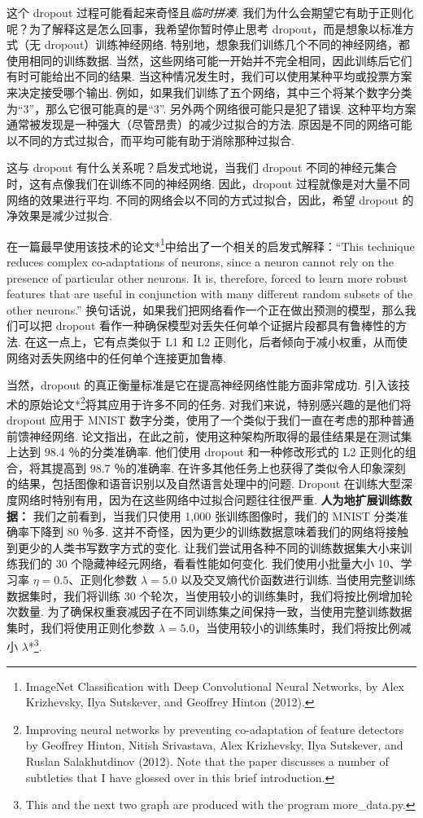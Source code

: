 这个 dropout 过程可能看起来奇怪且\emph{临时拼凑}. 我们为什么会期望它有助于正则化呢？为了解释这是怎么回事，我希望你暂时停止思考 dropout，而是想象以标准方式（无 dropout）训练神经网络. 特别地，想象我们训练几个不同的神经网络，都使用相同的训练数据. 当然，这些网络可能一开始并不完全相同，因此训练后它们有时可能给出不同的结果. 当这种情况发生时，我们可以使用某种平均或投票方案来决定接受哪个输出. 例如，如果我们训练了五个网络，其中三个将某个数字分类为``3''，那么它很可能真的是``3''. 另外两个网络很可能只是犯了错误. 这种平均方案通常被发现是一种强大（尽管昂贵）的减少过拟合的方法. 原因是不同的网络可能以不同的方式过拟合，而平均可能有助于消除那种过拟合.

这与 dropout 有什么关系呢？启发式地说，当我们 dropout 不同的神经元集合时，这有点像我们在训练不同的神经网络. 因此，dropout 过程就像是对大量不同网络的效果进行平均. 不同的网络会以不同的方式过拟合，因此，希望 dropout 的净效果是减少过拟合.

在一篇最早使用该技术的论文*\footnote{ImageNet Classification with Deep Convolutional Neural Networks, by Alex Krizhevsky, Ilya Sutskever, and Geoffrey Hinton (2012).}中给出了一个相关的启发式解释：``This technique reduces complex co-adaptations of neurons, since a neuron cannot rely on the presence of particular other neurons. It is, therefore, forced to learn more robust features that are useful in conjunction with many different random subsets of the other neurons.'' 换句话说，如果我们把网络看作一个正在做出预测的模型，那么我们可以把 dropout 看作一种确保模型对丢失任何单个证据片段都具有鲁棒性的方法. 在这一点上，它有点类似于 L1 和 L2 正则化，后者倾向于减小权重，从而使网络对丢失网络中的任何单个连接更加鲁棒.

当然，dropout 的真正衡量标准是它在提高神经网络性能方面非常成功. 引入该技术的原始论文*\footnote{Improving neural networks by preventing co-adaptation of feature detectors by Geoffrey Hinton, Nitish Srivastava, Alex Krizhevsky, Ilya Sutskever, and Ruslan Salakhutdinov (2012). Note that the paper discusses a number of subtleties that I have glossed over in this brief introduction.}将其应用于许多不同的任务. 对我们来说，特别感兴趣的是他们将 dropout 应用于 MNIST 数字分类，使用了一个类似于我们一直在考虑的那种普通前馈神经网络. 论文指出，在此之前，使用这种架构所取得的最佳结果是在测试集上达到 $98.4$ ％的分类准确率. 他们使用 dropout 和一种修改形式的 L2 正则化的组合，将其提高到 $98.7$ ％的准确率. 在许多其他任务上也获得了类似令人印象深刻的结果，包括图像和语音识别以及自然语言处理中的问题. Dropout 在训练大型深度网络时特别有用，因为在这些网络中过拟合问题往往很严重. \textbf{人为地扩展训练数据：} 我们之前看到，当我们只使用 1,000 张训练图像时，我们的 MNIST 分类准确率下降到 80 ％多. 这并不奇怪，因为更少的训练数据意味着我们的网络将接触到更少的人类书写数字方式的变化. 让我们尝试用各种不同的训练数据集大小来训练我们的 30 个隐藏神经元网络，看看性能如何变化. 我们使用小批量大小 10、学习率 $\eta = 0.5$、正则化参数 $\lambda = 5.0$ 以及交叉熵代价函数进行训练. 当使用完整训练数据集时，我们将训练 30 个轮次，当使用较小的训练集时，我们将按比例增加轮次数量. 为了确保权重衰减因子在不同训练集之间保持一致，当使用完整训练数据集时，我们将使用正则化参数 $\lambda = 5.0$，当使用较小的训练集时，我们将按比例减小 $\lambda$*\footnote{This and the next two graph are produced with the program more\_\allowbreak{}data.py.}.

